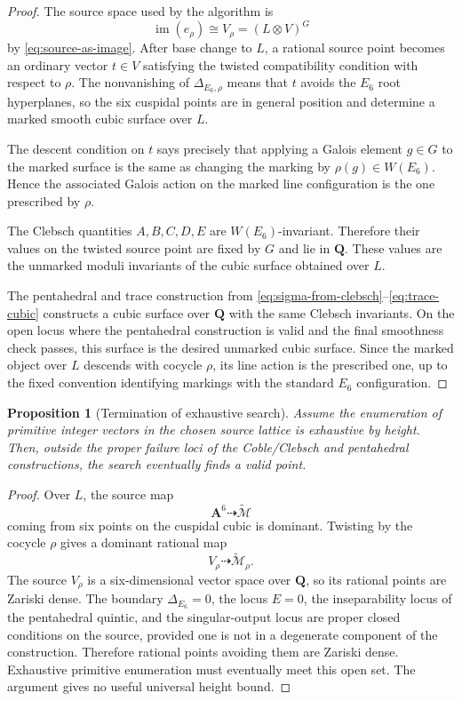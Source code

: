 \documentclass[11pt]{article}
\newcommand{\QQ}{\mathbf{Q}}
\newcommand{\Aff}{\mathbf{A}}
\newcommand{\im}{\operatorname{im}}
\newcommand{\tcM}{\widetilde{\mathcal{M}}}
\newcommand{\DeltaE}{\Delta_{E_6}}
\newtheorem{proposition}[definition]{Proposition}
\begin{document}
\begin{proof}
The source space used by the algorithm is
\[
  \im(e_\rho)\cong V_\rho=(L\otimes V)^G
\]
by \cref{eq:source-as-image}.  After base change to $L$, a rational source point
becomes an ordinary vector $t\in V$ satisfying the twisted compatibility condition
with respect to $\rho$.  The nonvanishing of $\Delta_{E_6,\rho}$ means that $t$ avoids
the $E_6$ root hyperplanes, so the six cuspidal points are in general position and
determine a marked smooth cubic surface over $L$.

The descent condition on $t$ says precisely that applying a Galois element
$g\in G$ to the marked surface is the same as changing the marking by
$\rho(g)\in W(E_6)$.  Hence the associated Galois action on the marked line
configuration is the one prescribed by $\rho$.

The Clebsch quantities $A,B,C,D,E$ are $W(E_6)$-invariant.  Therefore their values
on the twisted source point are fixed by $G$ and lie in $\QQ$.  These values are
the unmarked moduli invariants of the cubic surface obtained over $L$.

The pentahedral and trace construction from
\eqref{eq:sigma-from-clebsch}--\eqref{eq:trace-cubic} constructs a cubic surface
over $\QQ$ with the same Clebsch invariants.  On the open locus where the
pentahedral construction is valid and the final smoothness check passes, this
surface is the desired unmarked cubic surface.  Since the marked object over $L$
descends with cocycle $\rho$, its line action is the prescribed one, up to the
fixed convention identifying markings with the standard $E_6$ configuration.
\end{proof}

\begin{proposition}[Termination of exhaustive search]
Assume the enumeration of primitive integer vectors in the chosen source lattice is
exhaustive by height.  Then, outside the proper failure loci of the Coble/Clebsch
and pentahedral constructions, the search eventually finds a valid point.
\end{proposition}

\begin{proof}
Over $L$, the source map
\[
  \Aff^6\dashrightarrow \tcM
\]
coming from six points on the cuspidal cubic is dominant.  Twisting by the cocycle
$\rho$ gives a dominant rational map
\[
  V_\rho\dashrightarrow \tcM_\rho.
\]
The source $V_\rho$ is a six-dimensional vector space over $\QQ$, so its rational
points are Zariski dense.  The boundary $\DeltaE=0$, the locus $E=0$, the
inseparability locus of the pentahedral quintic, and the singular-output locus are
proper closed conditions on the source, provided one is not in a degenerate
component of the construction.  Therefore rational points avoiding them are
Zariski dense.  Exhaustive primitive enumeration must eventually meet this open
set.  The argument gives no useful universal height bound.
\end{proof}
\end{document}
